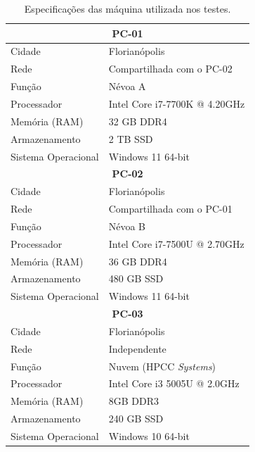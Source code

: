 \begin{table}[htb]
    \caption{\label{tab:especificacoes_maquinas}Especificações das máquina utilizada nos testes.}
    \centering
    \begin{tabular}{|l|l|}
        \hline
            \multicolumn{2}{|c|}{\textbf{PC-01}} \\
        \hline
            Cidade & Florianópolis \\
        \hline
            Rede & Compartilhada com o PC-02 \\
        \hline
            Função & Névoa A \\
        \hline
            Processador & Intel Core i7-7700K @ 4.20GHz \\
        \hline
            Memória (\gls{RAM}) & 32 GB DDR4 \\
        \hline
            Armazenamento & 2 TB \gls{SSD} \\
        \hline
            Sistema Operacional & Windows 11 64-bit \\
        \hline\hline

        \multicolumn{2}{|c|}{\textbf{PC-02}} \\
        \hline
            Cidade & Florianópolis \\
        \hline
            Rede & Compartilhada com o PC-01 \\
        \hline
            Função & Névoa B \\
        \hline
            Processador & Intel Core i7-7500U @ 2.70GHz \\
        \hline
            Memória (\gls{RAM}) & 36 GB DDR4 \\
        \hline
            Armazenamento & 480 GB \gls{SSD} \\
        \hline
            Sistema Operacional & Windows 11 64-bit \\
        \hline\hline

        \multicolumn{2}{|c|}{\textbf{PC-03}} \\
        \hline
            Cidade & Florianópolis \\
        \hline
            Rede & Independente \\
        \hline
            Função & Nuvem (\gls{HPCC} \textit{Systems}) \\
        \hline
            Processador & Intel Core i3 5005U @ 2.0GHz \\
        \hline
            Memória (\gls{RAM}) & 8GB DDR3 \\
        \hline
            Armazenamento & 240 GB \gls{SSD} \\
        \hline
            Sistema Operacional & Windows 10 64-bit \\
        \hline\hline


\end{tabular}
\end{table}
